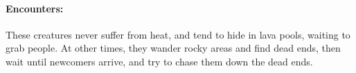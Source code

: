 \begin{multicols}{2}
\paragraph{Encounters:} These creatures never suffer from heat, and tend to hide in lava pools, waiting to grab people.
At other times, they wander rocky areas and find dead ends, then wait until newcomers arrive, and try to chase them down the dead ends.

\lavaman

\end{multicols}

